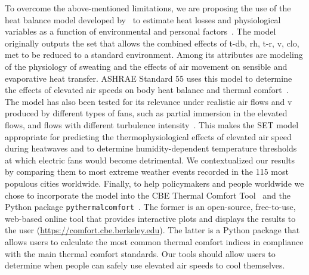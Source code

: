 To overcome the above-mentioned limitations, we are proposing the use of the heat balance model developed by~ to estimate heat losses and physiological variables as a function of environmental and personal factors~\cite{Gagge1986}.
The model originally outputs the \ac{set} that allows the combined effects of \ac{t-db}, \ac{rh}, \ac{t-r}, \ac{v}, \ac{clo}, \ac{met} to be reduced to a standard environment.
Among its attributes are modeling of the physiology of sweating and the effects of air movement on sensible and evaporative heat transfer.
ASHRAE Standard 55 uses this model to determine the effects of elevated air speeds on body heat balance and thermal comfort~\cite{ashrae552017}.
The model has also been tested for its relevance under realistic air flows and \ac{v} produced by different types of fans, such as partial immersion in the elevated flows, and flows with different turbulence intensity~\cite{Huang2014}.
This makes the SET model appropriate for predicting the thermophysiological effects of elevated air speed during heatwaves and to determine humidity-dependent temperature thresholds at which electric fans would become detrimental.
We contextualized our results by comparing them to most extreme weather events recorded in the 115 most populous cities worldwide.
Finally, to help policymakers and people worldwide we chose to incorporate the model into the CBE Thermal Comfort Tool~\cite{Tartarini2020} and the Python package \verb|pythermalcomfort|~\cite{Tartarini2020a}.
The former is an open-source, free-to-use, web-based online tool that provides interactive plots and displays the results to the user (\url{https://comfort.cbe.berkeley.edu}).
The latter is a Python package that allows users to calculate the most common thermal comfort indices in compliance with the main thermal comfort standards.
Our tools should allow users to determine when people can safely use elevated air speeds to cool themselves.